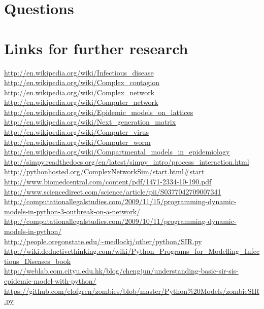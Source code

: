 \documentclass{article}
\begin{document}
\section{Questions}
\section{Links for further research}


\url{http://en.wikipedia.org/wiki/Infectious_disease  }\\
\url{http://en.wikipedia.org/wiki/Complex_contagion   }\\
\url{http://en.wikipedia.org/wiki/Complex_network     }\\
\url{http://en.wikipedia.org/wiki/Computer_network    }\\
\url{http://en.wikipedia.org/wiki/Epidemic_models_on_lattices}\\
\url{http://en.wikipedia.org/wiki/Next_generation_matrix}\\
\url{http://en.wikipedia.org/wiki/Computer_virus}\\
\url{http://en.wikipedia.org/wiki/Computer_worm}\\
\url{http://en.wikipedia.org/wiki/Compartmental_models_in_epidemiology}\\
\url{http://simpy.readthedocs.org/en/latest/simpy_intro/process_interaction.html}\\
\url{http://pythonhosted.org/ComplexNetworkSim/start.html#start}\\
\url{http://www.biomedcentral.com/content/pdf/1471-2334-10-190.pdf}\\
\url{http://www.sciencedirect.com/science/article/pii/S0377042709007341}\\
\url{http://computationallegalstudies.com/2009/11/15/programming-dynamic-models-in-python-3-outbreak-on-a-network/}\\
\url{http://computationallegalstudies.com/2009/10/11/programming-dynamic-models-in-python/}\\
\url{http://people.oregonstate.edu/~medlockj/other/python/SIR.py}\\
\url{http://wiki.deductivethinking.com/wiki/Python_Programs_for_Modelling_Infectious_Diseases_book}\\
\url{http://weblab.com.cityu.edu.hk/blog/chengjun/understanding-basic-sir-sis-epidemic-model-with-python/}
\url{https://github.com/elofgren/zombies/blob/master/Python%20Models/zombieSIR.py}\\
\end{document}
